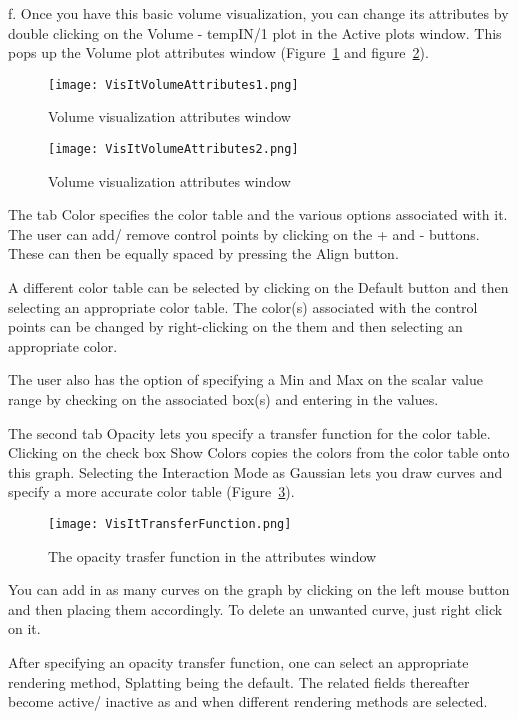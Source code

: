 f. Once you have this basic volume visualization, you can change its attributes by double clicking on the Volume - tempIN/1 plot in the Active plots window. This pops up the Volume plot attributes window (Figure~\ref{VisItVolumeAttributes1} and figure~\ref{VisItVolumeAttributes2}).

\begin{figure}
  \center
  \texttt{[image: VisItVolumeAttributes1.png]}
  \caption{Volume visualization attributes window}
  \label{VisItVolumeAttributes1}
\end{figure}

\begin{figure}
  \center
  \texttt{[image: VisItVolumeAttributes2.png]}
  \caption{Volume visualization attributes window}
  \label{VisItVolumeAttributes2}
\end{figure}

The tab Color specifies the color table and the various options associated with it. The user can add/ remove control points by clicking on the + and - buttons. These can then be equally spaced by pressing the Align button.

A different color table can be selected by clicking on the Default button and then selecting an appropriate color table. The color(s) associated with the control points can be changed by right-clicking on the them and then selecting an appropriate color.

The user also has the option of specifying a Min and Max on the scalar value range by checking on the associated box(s) and entering in the values.

The second tab Opacity lets you specify a transfer function for the color table. Clicking on the check box Show Colors copies the colors from the color table onto this graph. Selecting the Interaction Mode as Gaussian lets you draw curves and specify a more accurate color table (Figure~\ref{VisItTransferFunction}).

\begin{figure}
  \center
  \texttt{[image: VisItTransferFunction.png]}
  \caption{The opacity trasfer function in the attributes window}
  \label{VisItTransferFunction}
\end{figure}

You can add in as many curves on the graph by clicking on the left mouse button and then placing them accordingly. To delete an unwanted curve, just right click on it.

After specifying an opacity transfer function, one can select an appropriate rendering method, Splatting being the default. The related fields thereafter become active/ inactive as and when different rendering methods are selected.

